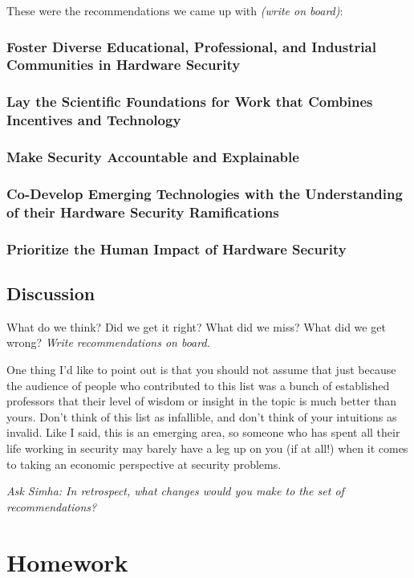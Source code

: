 \documentclass[11pt]{article}
\begin{document}
These were the recommendations we came up with {\it (write on board)}:

\subsubsection{Foster Diverse Educational, Professional, and Industrial Communities in Hardware Security}

\subsubsection{Lay the Scientific Foundations for Work that Combines Incentives and Technology}

\subsubsection{ Make Security Accountable and Explainable}

\subsubsection{Co-Develop Emerging Technologies with the Understanding of their Hardware Security Ramifications}

\subsubsection{Prioritize the Human Impact of Hardware Security}

\subsection{Discussion}

What do we think? Did we get it right? What did we miss? What did we get wrong? {\it Write recommendations on board.}

One thing I'd like to point out is that you should not assume that just because the audience of people who contributed to this list was a bunch of established professors that their level of wisdom or insight in the topic is much better than yours. Don't think of this list as infallible, and don't think of your intuitions as invalid. Like I said, this is an emerging area, so someone who has spent all their life working in security may barely have a leg up on you (if at all!) when it comes to taking an economic perspective at security problems. 

{\it Ask Simha: In retrospect, what changes would you make to the set of recommendations?}


\section{Homework}
\end{document}

